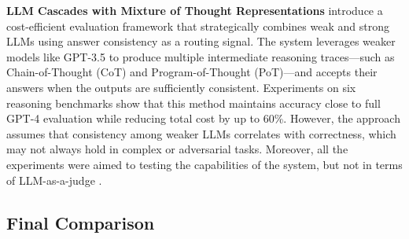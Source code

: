 \documentclass[sigconf, authoryear]{acmart}
\begin{document}
\textbf{LLM Cascades with Mixture of Thought Representations} introduce a cost-efficient evaluation framework that strategically combines weak and strong LLMs using answer consistency as a routing signal.
The system leverages weaker models like GPT-3.5 to produce multiple intermediate reasoning traces—such as Chain-of-Thought (CoT) and Program-of-Thought (PoT)—and accepts their answers when the outputs are sufficiently consistent.
Experiments on six reasoning benchmarks show that this method maintains accuracy close to full GPT-4 evaluation while reducing total cost by up to 60\%.
However, the approach assumes that consistency among weaker LLMs correlates with correctness, which may not always hold in complex or adversarial tasks.
Moreover, all the experiments were aimed to testing the capabilities of the system, but not in terms of LLM-as-a-judge \cite{yue2024largelanguagemodelcascades}.

\subsection{Final Comparison}\label{subsec:final-comparison}
\end{document}
